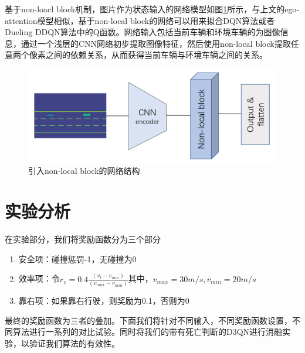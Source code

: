 \documentclass[letterpaper, 10 pt, conference]{ieeeconf}  %
\begin{document}
基于non-loacl block机制，图片作为状态输入的网络模型如图\ref{fig:基于non-local block的网络结构}所示，与上文的ego-attention模型相似，基于non-local block的网络可以用来拟合DQN算法或者Dueling DDQN算法中的Q函数。网络输入包括当前车辆和环境车辆的为图像信息，通过一个浅层的CNN网络初步提取图像特征，然后使用non-local block提取任意两个像素之间的依赖关系，从而获得当前车辆与环境车辆之间的关系。
\begin{figure}[htbp]
    \centering
    \includegraphics[width=\linewidth]{fig/non-local网络.png}
    \caption{引入non-local block的网络结构}
    \label{fig:基于non-local block的网络结构}
  \end{figure}


\section{实验分析}
在实验部分，我们将奖励函数分为三个部分
\begin{enumerate}
    \item 安全项：碰撞惩罚-1，无碰撞为0
    \item 效率项：令$r_v = 0.4\frac{(v_t-v_{min})}{(v_{max}-v_{min})}$其中，$v_{max} = 30m/s,v_{min}=20m/s$
    \item 靠右项：如果靠右行驶，则奖励为0.1，否则为0
\end{enumerate}

最终的奖励函数为三者的叠加。下面我们将针对不同输入，不同奖励函数设置，不同算法进行一系列的对比试验。同时将我们的带有死亡判断的D3QN进行消融实验，以验证我们算法的有效性。
\end{document}
